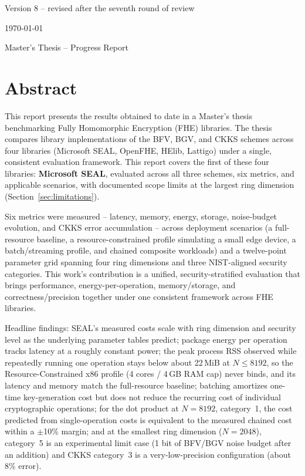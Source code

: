 \documentclass[11pt]{article}
\begin{document}
\begin{titlepage}
  \vfill

  {\large Version 8 -- revised after the seventh round of review\par}
  \vspace{0.2cm}
  {\large \today\par}
  \vspace{0.5cm}
  {\small\textcolor{softGray}{Master's Thesis -- Progress Report}\par}

\end{titlepage}

\tableofcontents
\newpage

\section*{Abstract}

This report presents the results obtained to date in a Master's thesis benchmarking Fully Homomorphic Encryption (FHE) libraries. The thesis compares library implementations of the BFV, BGV, and CKKS schemes across four libraries (Microsoft SEAL, OpenFHE, HElib, Lattigo) under a single, consistent evaluation framework. This report covers the first of these four libraries: \textbf{Microsoft SEAL}, evaluated across all three schemes, six metrics, and applicable scenarios, with documented scope limits at the largest ring dimension (Section~\ref{sec:limitations}).

Six metrics were measured -- latency, memory, energy, storage, noise-budget evolution, and CKKS error accumulation -- across deployment scenarios (a full-resource baseline, a resource-constrained profile simulating a small edge device, a batch/streaming profile, and chained composite workloads) and a twelve-point parameter grid spanning four ring dimensions and three NIST-aligned security categories. This work's contribution is a unified, security-stratified evaluation that brings performance, energy-per-operation, memory/storage, and correctness/precision together under one consistent framework across FHE libraries.

Headline findings: SEAL's measured costs scale with ring dimension and security level as the underlying parameter tables predict; package energy per operation tracks latency at a roughly constant power; the peak process RSS observed while repeatedly running one operation stays below about 22\,MiB at $N \le 8192$, so the Resource-Constrained x86 profile (4 cores / 4\,GB RAM cap) never binds, and its latency and memory match the full-resource baseline; batching amortizes one-time key-generation cost but does not reduce the recurring cost of individual cryptographic operations; for the dot product at $N{=}8192$, category~1, the cost predicted from single-operation costs is equivalent to the measured chained cost within a $\pm$10\% margin; and at the smallest ring dimension ($N{=}2048$), category~5 is an experimental limit case (1 bit of BFV/BGV noise budget after an addition) and CKKS category~3 is a very-low-precision configuration (about 8\% error).
\end{document}
